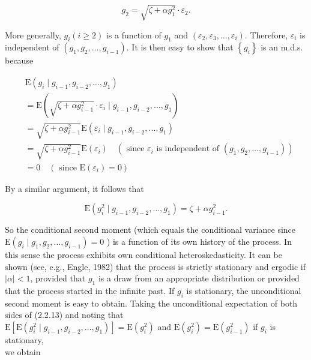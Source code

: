 \documentclass[10pt]{article}
\begin{document}
$$
g_{2}=\sqrt{\zeta+\alpha g_{1}^{2}} \cdot \varepsilon_{2} .
$$

More generally, $g_{i}(i \geq 2)$ is a function of $g_{1}$ and $\left(\varepsilon_{2}, \varepsilon_{3}, \ldots, \varepsilon_{i}\right)$. Therefore, $\varepsilon_{i}$ is independent of $\left(g_{1}, g_{2}, \ldots, g_{i-1}\right)$. It is then easy to show that $\left\{g_{i}\right\}$ is an m.d.s. because


\begin{align*}
& \mathrm{E}\left(g_{i} \mid g_{i-1}, g_{i-2}, \ldots, g_{1}\right)  \tag{2.2.11}\\
& =\mathrm{E}\left(\sqrt{\zeta+\alpha g_{i-1}^{2}} \cdot \varepsilon_{i} \mid g_{i-1}, g_{i-2}, \ldots, g_{1}\right) \\
& =\sqrt{\zeta+\alpha g_{i-1}^{2}} \mathrm{E}\left(\varepsilon_{i} \mid g_{i-1}, g_{i-2}, \ldots, g_{1}\right) \\
& =\sqrt{\zeta+\alpha g_{i-1}^{2}} \mathrm{E}\left(\varepsilon_{i}\right) \quad\left(\text { since } \varepsilon_{i} \text { is independent of }\left(g_{1}, g_{2}, \ldots, g_{i-1}\right)\right) \\
& =0 \quad\left(\text { since } \mathrm{E}\left(\varepsilon_{i}\right)=0\right) \tag{2.2.12}
\end{align*}


By a similar argument, it follows that


\begin{equation*}
\mathrm{E}\left(g_{i}^{2} \mid g_{i-1}, g_{i-2}, \ldots, g_{1}\right)=\zeta+\alpha g_{i-1}^{2} . \tag{2.2.13}
\end{equation*}


So the conditional second moment (which equals the conditional variance since $\mathrm{E}\left(g_{i} \mid g_{1}, g_{2}, \ldots, g_{i-1}\right)=0$ ) is a function of its own history of the process. In this sense the process exhibits own conditional heteroskedasticity. It can be shown (see, e.g., Engle, 1982) that the process is strictly stationary and ergodic if $|\alpha|<1$, provided that $g_{1}$ is a draw from an appropriate distribution or provided that the process started in the infinite past. If $g_{i}$ is stationary, the unconditional second moment is easy to obtain. Taking the unconditional expectation of both sides of (2.2.13) and noting that\\
$\mathrm{E}\left[\mathrm{E}\left(g_{i}^{2} \mid g_{i-1}, g_{i-2}, \ldots, g_{1}\right)\right]=\mathrm{E}\left(g_{i}^{2}\right)$ and $\mathrm{E}\left(g_{i}^{2}\right)=\mathrm{E}\left(g_{i-1}^{2}\right)$ if $g_{i}$ is stationary,\\
we obtain
\end{document}
